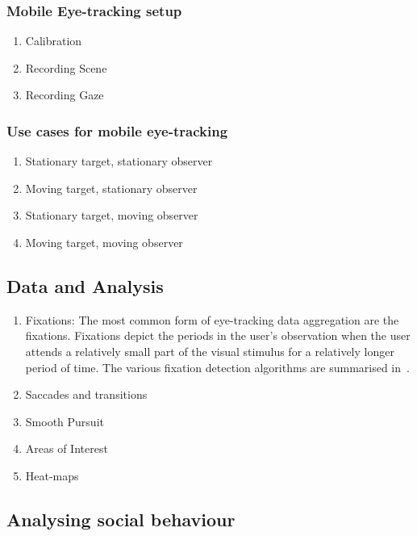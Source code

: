 \documentclass{sig-alternate}
\begin{document}
\subsubsection{Mobile Eye-tracking setup}

\begin{enumerate}
\item Calibration
\item Recording Scene 
\item Recording Gaze

\end {enumerate}

\subsubsection{Use cases for mobile eye-tracking} 

\begin{enumerate}
\item Stationary target, stationary observer
\item Moving target, stationary observer
\item Stationary target, moving observer
\item Moving target, moving observer
\end{enumerate}


\subsection{Data and Analysis}

\begin{enumerate}
\item Fixations: The most common form of eye-tracking data aggregation are the fixations.
Fixations depict the periods in the user's observation when the user
attends a relatively small part of the visual stimulus for a relatively
longer period of time. The various fixation detection algorithms are
summarised in~\cite{duchowski2007eye}. 

\item Saccades and transitions
\item Smooth Pursuit
\item Areas of Interest
\item Heat-maps

\end {enumerate}


\subsection{Analysing social behaviour}
\end{document}
